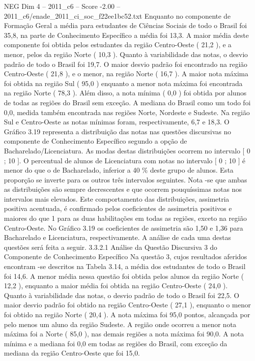 \begin{textsample}{NEG Dim 4 – 2011\_c6 – Score -2.00 – 2011\_c6/enade\_2011\_ci\_soc\_f22ee1bc52.txt}
Enquanto no componente de Formação Geral a média para estudantes de Ciências Sociais de todo o Brasil foi 35,8, na parte de Conhecimento Específico a média foi 13,3.
A maior média deste componente foi obtida pelos estudantes da região Centro-Oeste ( 21,2 ), e a menor, pelos da região Norte ( 10,3 ).
Quanto à variabilidade das notas, o desvio padrão de todo o Brasil foi 19,7.
O maior desvio padrão foi encontrado na região Centro-Oeste ( 21,8 ), e o menor, na região Norte ( 16,7 ).
A maior nota máxima foi obtida na região Sul ( 95,0 ) enquanto a menor nota máxima foi encontrada na região Norte ( 78,3 ).
Além disso, a nota mínima ( 0,0 ) foi obtida por alunos de todas as regiões do Brasil sem exceção.
A mediana do Brasil como um todo foi 0,0, medida também encontrada nas regiões Norte, Nordeste e Sudeste.
Na região Sul e Centro-Oeste as notas mínimas foram, respectivamente, 6,7 e 18,3.
O Gráfico 3.19 representa a distribuição das notas nas questões discursivas no componente de Conhecimento Específico segundo a opção de Bacharelado/Licenciatura.
As modas destas distribuições ocorrem no intervalo [ 0 ; 10 ].
O percentual de alunos de Licenciatura com notas no intervalo [ 0 ; 10 ] é menor do que o de Bacharelado, inferior a 40 \% deste grupo de alunos.
Esta proporção se inverte para os outros três intervalos seguintes.
Nota -se que ambas as distribuições são sempre decrescentes e que ocorrem pouquíssimas notas nos intervalos mais elevados.
Este comportamento das distribuições, assimetria positiva acentuada, é confirmado pelos coeficientes de assimetria positivos e maiores do que 1 para as duas habilitações em todas as regiões, exceto na região Centro-Oeste.
No Gráfico 3.19 os coeficientes de assimetria são 1,50 e 1,36 para Bacharelado e Licenciatura, respectivamente.
A análise de cada uma destas questões será feita a seguir. 3.3.2.1 Análise da Questão Discursiva 3 do Componente de Conhecimento Específico Na questão 3, cujos resultados aferidos encontram -se descritos na Tabela 3.14, a média dos estudantes de todo o Brasil foi 14,6.
A menor média nessa questão foi obtida pelos alunos da região Norte ( 12,2 ), enquanto a maior média foi obtida na região Centro-Oeste ( 24,0 ).
Quanto à variabilidade das notas, o desvio padrão de todo o Brasil foi 22,5.
O maior desvio padrão foi obtido na região Centro-Oeste ( 27,1 ), enquanto o menor foi obtido na região Norte ( 20,4 ).
A nota máxima foi 95,0 pontos, alcançada por pelo menos um aluno da região Sudeste.
A região onde ocorreu a menor nota máxima foi a Norte ( 85,0 ), nas demais regiões a nota máxima foi 90,0.
A nota mínima e a mediana foi 0,0 em todas as regiões do Brasil, com exceção da mediana da região Centro-Oeste que foi 15,0.

\end{textsample}
